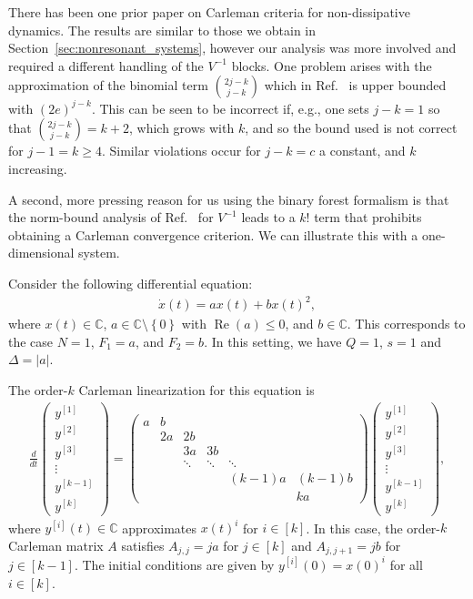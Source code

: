 \documentclass[superscriptaddress,onecolumn,nofootinbib,longbibliography,a4paper,accepted=2026-09-29]{quantumarticle}
\theoremstyle{plain}
\theoremstyle{definition}
\numberwithin{thm}{section}
\numberwithin{assumption}{section}
\numberwithin{lemma}{section}
\numberwithin{prop}{section}
\numberwithin{cor}{section}
\numberwithin{definition}{section}
\numberwithin{rmk}{section}
\numberwithin{equation}{section}
\newcommand{\abs}[1]      {\left| #1 \right|}
\newcommand{\myC}{\mathbb{C}}
\newcommand{\lrb}[1]{\left ( #1 \right )}
\newcommand{\lrcb}[1]{\left \{ #1 \right \}}
\newcommand{\realpart}[1]{\operatorname{Re}\lrb{#1}}
\begin{document}
There has been one prior paper on Carleman criteria for non-dissipative dynamics. The results are similar to those we obtain in Section~\ref{sec:nonresonant_systems}, however our analysis was more involved and required a different handling of the $V^{-1}$ blocks. One problem arises with the approximation of the binomial term $\binom{2j-k}{j-k}$ which in Ref.~\cite{wu2024quantum} is upper bounded with $(2e)^{j-k}$. This can be seen to be incorrect if, e.g., one sets $j-k=1$ so that $\binom{2j-k}{j-k}= k+2$, which grows with $k$, and so the bound used is not correct for $j-1=k\geq 4$. Similar violations occur for $j-k=c$ a constant, and $k$ increasing.

A second, more pressing reason for us using the binary forest formalism is that the norm-bound analysis of Ref.~\cite{wu2024quantum} for $V^{-1}$ leads to a $k!$ term that prohibits obtaining a Carleman convergence criterion. We can illustrate this with a one-dimensional system.

Consider the following differential equation:
\begin{align}
    \dot{x}(t) = a x(t) + b x(t)^2, 
\end{align}
where $x(t) \in \myC$, $a \in \myC\setminus \lrcb{0}$ with $\realpart{a} \le 0$, and $b \in \myC$. This corresponds to the case $N=1$, $F_1 = a$, and
$F_2 = b$. In this setting, we have $Q=1$, $s=1$ and $\Delta = \abs{a}$.

The order-$k$ Carleman linearization for this equation is
\begin{align}
\frac{d}{dt}\begin{pmatrix}
    y^{[1]} \\
    y^{[2]} \\
    y^{[3]} \\
    \vdots \\
    y^{[k-1]} \\
    y^{[k]}
    \end{pmatrix}=\begin{pmatrix}
    a & b & & & &\\
     & 2a & 2b & & &\\
            &  & 3a & 3b &       & \\
            &         & \ddots   & \ddots   & \ddots & \\
            &         &         &  & (k-1)a  & (k-1)b\\      
            &         &         &         &   & ka
    \end{pmatrix}\begin{pmatrix}
    y^{[1]} \\
    y^{[2]} \\
    y^{[3]} \\
    \vdots \\
    y^{[k-1]} \\
    y^{[k]}
    \end{pmatrix},      
\end{align}
where $y^{[i]}(t) \in \myC$ approximates $x(t)^i$ for $i \in [k]$.  In this case, the order-$k$ Carleman matrix $A$ satisfies $A_{j,j}=ja$ for $j \in [k]$ and $A_{j,j+1}=jb$ for $j \in [k-1]$. The initial conditions are given by $y^{[i]}(0)=x(0)^i$ for all $i \in [k]$. 
\end{document}
